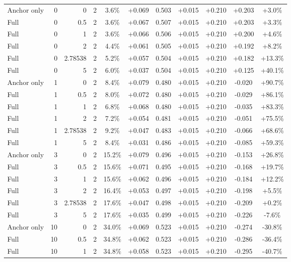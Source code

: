 \begin{table}[htbp]
\begin{tabular}{lrrrccccccc}
Anchor only & 0 & 0 & 2 & 3.6\% & +0.069 & 0.503 & +0.015 & +0.210 & +0.203 & +3.0\% \\
Full & 0 & 0.5 & 2 & 3.6\% & +0.067 & 0.507 & +0.015 & +0.210 & +0.203 & +3.3\% \\
Full & 0 & 1 & 2 & 3.6\% & +0.066 & 0.506 & +0.015 & +0.210 & +0.200 & +4.6\% \\
Full & 0 & 2 & 2 & 4.4\% & +0.061 & 0.505 & +0.015 & +0.210 & +0.192 & +8.2\% \\
Full & 0 & 2.78538 & 2 & 5.2\% & +0.057 & 0.504 & +0.015 & +0.210 & +0.182 & +13.3\% \\
Full & 0 & 5 & 2 & 6.0\% & +0.037 & 0.504 & +0.015 & +0.210 & +0.125 & +40.1\% \\
Anchor only & 1 & 0 & 2 & 8.4\% & +0.079 & 0.480 & +0.015 & +0.210 & -0.020 & +90.7\% \\
Full & 1 & 0.5 & 2 & 8.0\% & +0.072 & 0.480 & +0.015 & +0.210 & -0.029 & +86.1\% \\
Full & 1 & 1 & 2 & 6.8\% & +0.068 & 0.480 & +0.015 & +0.210 & -0.035 & +83.3\% \\
Full & 1 & 2 & 2 & 7.2\% & +0.054 & 0.481 & +0.015 & +0.210 & -0.051 & +75.5\% \\
Full & 1 & 2.78538 & 2 & 9.2\% & +0.047 & 0.483 & +0.015 & +0.210 & -0.066 & +68.6\% \\
Full & 1 & 5 & 2 & 8.4\% & +0.031 & 0.486 & +0.015 & +0.210 & -0.085 & +59.3\% \\
Anchor only & 3 & 0 & 2 & 15.2\% & +0.079 & 0.496 & +0.015 & +0.210 & -0.153 & +26.8\% \\
Full & 3 & 0.5 & 2 & 15.6\% & +0.071 & 0.495 & +0.015 & +0.210 & -0.168 & +19.7\% \\
Full & 3 & 1 & 2 & 15.6\% & +0.062 & 0.496 & +0.015 & +0.210 & -0.184 & +12.2\% \\
Full & 3 & 2 & 2 & 16.4\% & +0.053 & 0.497 & +0.015 & +0.210 & -0.198 & +5.5\% \\
Full & 3 & 2.78538 & 2 & 17.6\% & +0.047 & 0.498 & +0.015 & +0.210 & -0.209 & +0.2\% \\
Full & 3 & 5 & 2 & 17.6\% & +0.035 & 0.499 & +0.015 & +0.210 & -0.226 & -7.6\% \\
Anchor only & 10 & 0 & 2 & 34.0\% & +0.069 & 0.523 & +0.015 & +0.210 & -0.274 & -30.8\% \\
Full & 10 & 0.5 & 2 & 34.8\% & +0.062 & 0.523 & +0.015 & +0.210 & -0.286 & -36.4\% \\
Full & 10 & 1 & 2 & 34.8\% & +0.058 & 0.523 & +0.015 & +0.210 & -0.295 & -40.7\% \\

\end{tabular}
\end{table}
